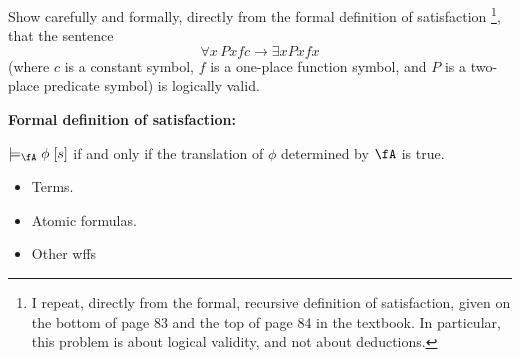\begin{problem}
  Show carefully and formally, directly from the formal definition of satisfaction
  \footnote{
    I repeat, directly from the formal, recursive definition of satisfaction,
    given on the bottom of page 83 and the top of page 84 in the textbook.
    In particular, this problem  is about logical validity, and not about deductions.
  },
  that the sentence \[\forall x\,  Pxfc \rightarrow \exists x Pxfx \]
  (where $c$ is a constant symbol, $f$ is a one-place function symbol,
  and $P$ is a two-place predicate symbol) is logically valid.
\end{problem}
\begin{Answer}
  \begin{blockcolor}
    \textbf{Formal definition of satisfaction:}

    \step
    $\models_\fA \phi \; [s]$ if and only if the translation of $\phi$
    determined by $\fA$ is true.

    \begin{itemize}
      \item Terms.
      \item Atomic formulas.
      \item Other wffs
    \end{itemize}
  \end{blockcolor}


\end{Answer}
